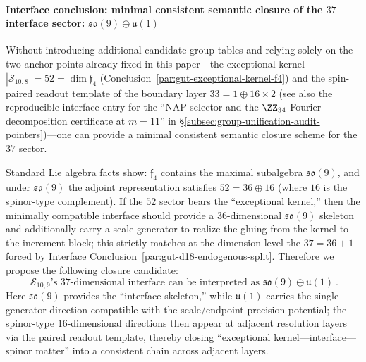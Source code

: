 \paragraph{Interface conclusion: minimal consistent semantic closure of the \texorpdfstring{$37$}{37} interface sector: \texorpdfstring{$\mathfrak{so}(9)\oplus\mathfrak{u}(1)$}{so(9)+u(1)}}\label{par:gut-sector37-so9-u1}
Without introducing additional candidate group tables and relying solely on the two anchor points already fixed in this paper---the exceptional kernel \(|\mathcal{S}_{10,8}|=52=\dim\mathfrak{f}_4\) (Conclusion~\ref{par:gut-exceptional-kernel-f4}) and the spin-paired readout template of the boundary layer \(33=1\oplus 16\times 2\) (see also the reproducible interface entry for the ``NAP selector and the \(\ZZ_{34}\) Fourier decomposition certificate at \(m=11\)'' in \S\ref{subsec:group-unification-audit-pointers})---one can provide a minimal consistent semantic closure scheme for the \(37\) sector.
\par
Standard Lie algebra facts show: \(\mathfrak{f}_4\) contains the maximal subalgebra \(\mathfrak{so}(9)\), and under \(\mathfrak{so}(9)\) the adjoint representation satisfies
\(
52=36\oplus 16
\)
(where \(16\) is the spinor-type complement).
If the \(52\) sector bears the ``exceptional kernel,'' then the minimally compatible interface should provide a \(36\)-dimensional \(\mathfrak{so}(9)\) skeleton and additionally carry a scale generator to realize the gluing from the kernel to the increment block;
this strictly matches at the dimension level the
\(
37=36+1
\)
forced by Interface Conclusion~\ref{par:gut-d18-endogenous-split}.
Therefore we propose the following closure candidate:
\[
\boxed{\ \mathcal{S}_{10,9}\text{'s \(37\)-dimensional interface can be interpreted as }\mathfrak{so}(9)\oplus\mathfrak{u}(1)\ }.
\]
Here \(\mathfrak{so}(9)\) provides the ``interface skeleton,'' while \(\mathfrak{u}(1)\) carries the single-generator direction compatible with the scale/endpoint precision potential; the spinor-type \(16\)-dimensional directions then appear at adjacent resolution layers via the paired readout template, thereby closing ``exceptional kernel---interface---spinor matter'' into a consistent chain across adjacent layers.

